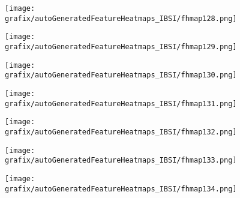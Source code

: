 \hspace{\hsp} 
\begin{subfigure}{\wid\textwidth} 
    \centering 
    \caption{\tiny \sffamily {}} 
    \vspace{\vsp} 
    \texttt{[image: grafix/autoGeneratedFeatureHeatmaps\_IBSI/fhmap128.png]} 
\end{subfigure} 
\hspace{\hsp} 
\begin{subfigure}{\wid\textwidth} 
    \centering 
    \caption{\tiny \sffamily {}} 
    \vspace{\vsp} 
    \texttt{[image: grafix/autoGeneratedFeatureHeatmaps\_IBSI/fhmap129.png]} 
\end{subfigure} 
\hspace{\hsp} 
\begin{subfigure}{\wid\textwidth} 
    \centering 
    \caption{\tiny \sffamily {}} 
    \vspace{\vsp} 
    \texttt{[image: grafix/autoGeneratedFeatureHeatmaps\_IBSI/fhmap130.png]} 
\end{subfigure} 
\hspace{\hsp} 
\begin{subfigure}{\wid\textwidth} 
    \centering 
    \caption{\tiny \sffamily {}} 
    \vspace{\vsp} 
    \texttt{[image: grafix/autoGeneratedFeatureHeatmaps\_IBSI/fhmap131.png]} 
\end{subfigure} 
\hspace{\hsp} 
\begin{subfigure}{\wid\textwidth} 
    \centering 
    \caption{\tiny \sffamily {}} 
    \vspace{\vsp} 
    \texttt{[image: grafix/autoGeneratedFeatureHeatmaps\_IBSI/fhmap132.png]} 
\end{subfigure} 
\hspace{\hsp} 
\begin{subfigure}{\wid\textwidth} 
    \centering 
    \caption{\tiny \sffamily {}} 
    \vspace{\vsp} 
    \texttt{[image: grafix/autoGeneratedFeatureHeatmaps\_IBSI/fhmap133.png]} 
\end{subfigure} 
\hspace{\hsp} 
\begin{subfigure}{\wid\textwidth} 
    \centering 
    \caption{\tiny \sffamily {}} 
    \vspace{\vsp} 
    \texttt{[image: grafix/autoGeneratedFeatureHeatmaps\_IBSI/fhmap134.png]} 
\end{subfigure} 
